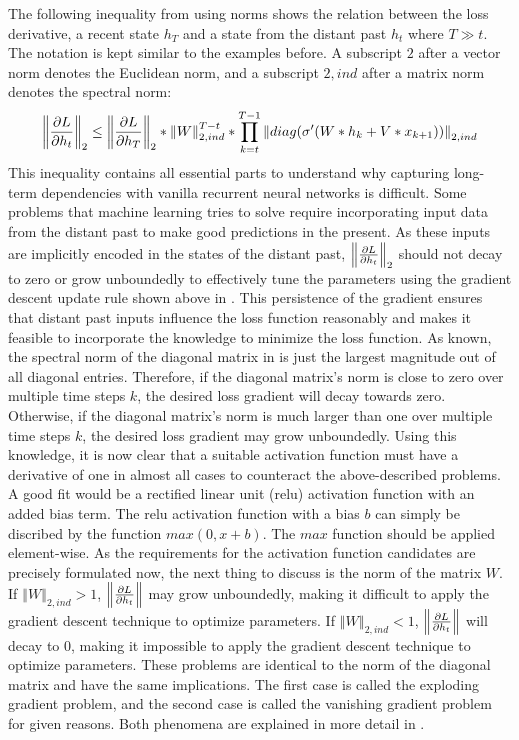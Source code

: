 \documentclass[draft,final]{vutinfth} %
\begin{document}
    The following inequality from \cite[p. 2]{UnitaryRNNs} using norms shows the relation between the loss derivative, a recent state $h_T$ and a state from the distant past $h_t$ where $T \gg t$.
    The notation is kept similar to the examples before. A subscript $2$ after a vector norm denotes the Euclidean norm, and a subscript $2,ind$ after a matrix norm denotes the spectral norm:
    \begin{align}
        \label{gradient_formula}
        \left\Vert \pdv{L}{h_t} \right\Vert_2 \leq \left\Vert \pdv{L}{h_T} \right\Vert_2 * \left\Vert W \right\Vert_{2,ind}^{T-t} * \prod^{T-1}_{k=t} \left\Vert diag(\sigma'(W*h_k + V*x_{k+1})) \right\Vert_{2,ind}
    \end{align}
    This inequality contains all essential parts to understand why capturing long-term dependencies with vanilla recurrent neural networks is difficult.
    Some problems that machine learning tries to solve require incorporating input data from the distant past to make good predictions in the present.
    As these inputs are implicitly encoded in the states of the distant past, $\left\Vert \pdv{L}{h_t} \right\Vert_2$ should not decay to zero or grow unboundedly to effectively tune the parameters using the gradient descent update rule shown above in .
    This persistence of the gradient ensures that distant past inputs influence the loss function reasonably and makes it feasible to incorporate the knowledge to minimize the loss function.
    As known, the spectral norm of the diagonal matrix in  is just the largest magnitude out of all diagonal entries.
    Therefore, if the diagonal matrix's norm is close to zero over multiple time steps $k$, the desired loss gradient will decay towards zero.
    Otherwise, if the diagonal matrix's norm is much larger than one over multiple time steps $k$, the desired loss gradient may grow unboundedly.
    Using this knowledge, it is now clear that a suitable activation function must have a derivative of one in almost all cases to counteract the above-described problems.
    A good fit would be a rectified linear unit (relu) activation function with an added bias term.
    The relu activation function with a bias $b$ can simply be discribed by the function $max(0,x+b)$. The $max$ function should be applied element-wise.
    As the requirements for the activation function candidates are precisely formulated now, the next thing to discuss is the norm of the matrix $W$.
    If $\left\Vert W \right\Vert_{2,ind} > 1$, $\left\Vert \pdv{L}{h_t} \right\Vert$ may grow unboundedly, making it difficult to apply the gradient descent technique to optimize parameters.
    If $\left\Vert W \right\Vert_{2,ind} < 1$, $\left\Vert \pdv{L}{h_t} \right\Vert$ will decay to $0$, making it impossible to apply the gradient descent technique to optimize parameters.
    These problems are identical to the norm of the diagonal matrix and have the same implications.
    The first case is called the exploding gradient problem, and the second case is called the vanishing gradient problem for given reasons.
    Both phenomena are explained in more detail in \cite{LongTermDependenciesGradientDescent}.
\end{document}
